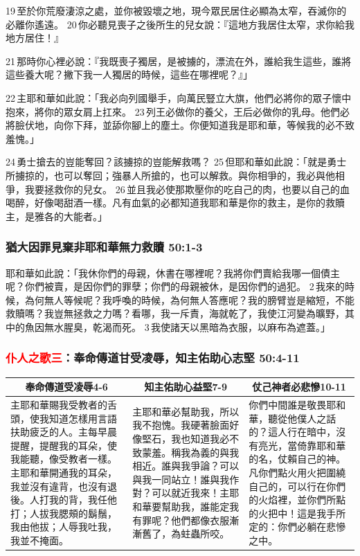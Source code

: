 19 至於你荒廢淒涼之處，並你被毀壞之地，現今眾民居住必顯為太窄，吞滅你的必離你遙遠。 20 你必聽見喪子之後所生的兒女說：『這地方我居住太窄，求你給我地方居住！』 

21 那時你心裡必說：『我既喪子獨居，是被擄的，漂流在外，誰給我生這些，誰將這些養大呢？撇下我一人獨居的時候，這些在哪裡呢？』」

22 主耶和華如此說：「我必向列國舉手，向萬民豎立大旗，他們必將你的眾子懷中抱來，將你的眾女肩上扛來。 23 列王必做你的養父，王后必做你的乳母。他們必將臉伏地，向你下拜，並舔你腳上的塵土。你便知道我是耶和華，等候我的必不致羞愧。」

24 勇士搶去的豈能奪回？該擄掠的豈能解救嗎？ 25 但耶和華如此說：「就是勇士所擄掠的，也可以奪回；強暴人所搶的，也可以解救。與你相爭的，我必與他相爭，我要拯救你的兒女。 26 並且我必使那欺壓你的吃自己的肉，也要以自己的血喝醉，好像喝甜酒一樣。凡有血氣的必都知道我耶和華是你的救主，是你的救贖主，是雅各的大能者。」


\subsubsection{猶大因罪見棄非耶和華無力救贖 50:1-3}
耶和華如此說：「我休你們的母親，休書在哪裡呢？我將你們賣給我哪一個債主呢？你們被賣，是因你們的罪孽；你們的母親被休，是因你們的過犯。 2 我來的時候，為何無人等候呢？我呼喚的時候，為何無人答應呢？我的膀臂豈是縮短，不能救贖嗎？我豈無拯救之力嗎？看哪，我一斥責，海就乾了，我使江河變為曠野，其中的魚因無水腥臭，乾渴而死。 3 我使諸天以黑暗為衣服，以麻布為遮蓋。」

\subsubsection{\textcolor{red}{仆人之歌三}：奉命傳道甘受凌辱，知主佑助心志堅 50:4-11}
\begin{table}[H]
\centering
\begin{tabular}{p{6cm}|p{5.50cm}|p{5.50cm}}\hline\hline
\multicolumn{1}{c|}{奉命傳道受凌辱4-6}&\multicolumn{1}{c|}{知主佑助心益堅7-9}&\multicolumn{1}{c}{仗己神者必悲慘10-11}\\\hline
主耶和華賜我受教者的舌頭，使我知道怎樣用言語扶助疲乏的人。主每早晨提醒，提醒我的耳朵，使我能聽，像受教者一樣。主耶和華開通我的耳朵，我並沒有違背，也沒有退後。人打我的背，我任他打；人拔我腮頰的鬍鬚，我由他拔；人辱我吐我，我並不掩面。
&主耶和華必幫助我，所以我不抱愧。我硬著臉面好像堅石，我也知道我必不致蒙羞。稱我為義的與我相近。誰與我爭論？可以與我一同站立！誰與我作對？可以就近我來！主耶和華要幫助我，誰能定我有罪呢？他們都像衣服漸漸舊了，為蛀蟲所咬。
&你們中間誰是敬畏耶和華，聽從他僕人之話的？這人行在暗中，沒有亮光，當倚靠耶和華的名，仗賴自己的神。凡你們點火用火把圍繞自己的，可以行在你們的火焰裡，並你們所點的火把中！這是我手所定的：你們必躺在悲慘之中。\\\hline
\end{tabular}
\end{table}


